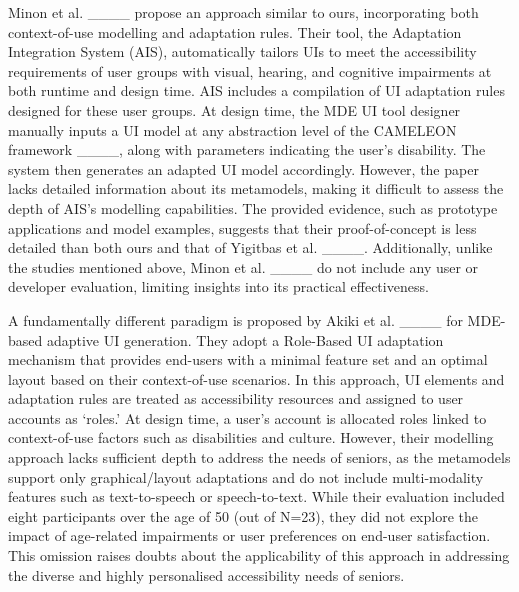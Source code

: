 Minon et al. ____ propose an approach similar to ours, incorporating both context-of-use modelling and adaptation rules. Their tool, the Adaptation Integration System (AIS), automatically tailors UIs to meet the accessibility requirements of user groups with visual, hearing, and cognitive impairments at both runtime and design time. AIS includes a compilation of UI adaptation rules designed for these user groups. At design time, the MDE UI tool designer manually inputs a UI model at any abstraction level of the CAMELEON framework ____, along with parameters indicating the user’s disability. The system then generates an adapted UI model accordingly. However, the paper lacks detailed information about its metamodels, making it difficult to assess the depth of AIS’s modelling capabilities. The provided evidence, such as prototype applications and model examples, suggests that their proof-of-concept is less detailed than both ours and that of Yigitbas et al. ____. Additionally, unlike the studies mentioned above, Minon et al. ____ do not include any user or developer evaluation, limiting insights into its practical effectiveness.

A fundamentally different paradigm is proposed by Akiki et al. ____ for MDE-based adaptive UI generation. They adopt a Role-Based UI adaptation mechanism that provides end-users with a minimal feature set and an optimal layout based on their context-of-use scenarios. In this approach, UI elements and adaptation rules are treated as accessibility resources and assigned to user accounts as ‘roles.’ At design time, a user’s account is allocated roles linked to context-of-use factors such as disabilities and culture. However, their modelling approach lacks sufficient depth to address the needs of seniors, as the metamodels support only graphical/layout adaptations and do not include multi-modality features such as text-to-speech or speech-to-text. While their evaluation included eight participants over the age of 50 (out of N=23), they did not explore the impact of age-related impairments or user preferences on end-user satisfaction. This omission raises doubts about the applicability of this approach in addressing the diverse and highly personalised accessibility needs of seniors.

